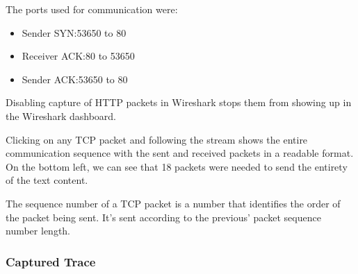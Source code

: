 The ports used for communication were:

\begin{itemize}
    \item Sender SYN:\@ 53650 to 80
    \item Receiver ACK:\@ 80 to 53650
    \item Sender ACK:\@ 53650 to 80
\end{itemize}

Disabling capture of HTTP packets in Wireshark stops them from showing up in
the Wireshark dashboard.

Clicking on any TCP packet and following the stream shows the entire
communication sequence with the sent and received packets in a readable format.
On the bottom left, we can see that 18 packets were needed to send the entirety
of the text content.

The sequence number of a TCP packet is a number that identifies the order of
the packet being sent. It's sent according to the previous' packet sequence
number length.

\subsubsection{Captured Trace}
